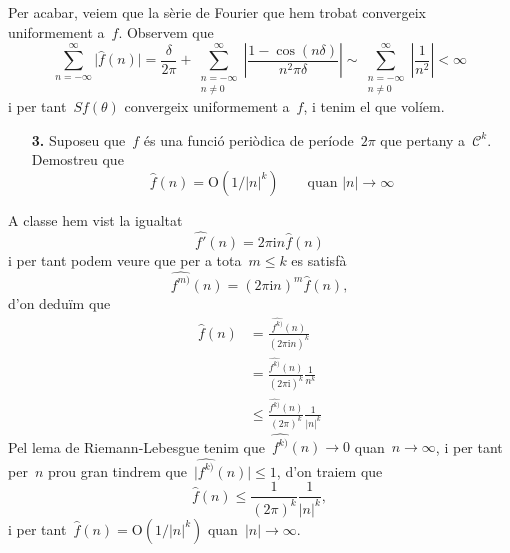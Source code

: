 \documentclass[a4paper]{article}
\newcommand{\iu}{\mathrm{i}}
\newcommand{\uppi}{\pi}
\newcommand{\abs}[1]{\lvert{#1}\rvert}
\newcommand{\Abs}[1]{\left\lvert{#1}\right\rvert}
\begin{document}
Per acabar, veiem que la sèrie de Fourier que hem trobat convergeix uniformement
a~\(f\). Observem que
\[
    \sum_{n=-\infty}^{\infty}\abs{\widehat{f}(n)}
    = \frac{\delta}{2\uppi} + \sum_{\substack{n=-\infty\\n\neq0}}^{\infty}
    \Abs{\frac{1 - \cos(n\delta)}{n^{2}\uppi\delta}}
    \sim \sum_{\substack{n=-\infty\\n\neq0}}^{\infty} \Abs{\frac{1}{n^{2}}}
    < \infty
\]
i per tant~\(Sf(\theta)\) convergeix uniformement a~\(f\), i tenim el que
volíem.

\clearpage
\begin{enumerate}
    \item[\textbf{3.}] Suposeu que~\(f\) és una funció periòdica de
        període~\(2\uppi\) que pertany a~\(\mathcal{C}^{k}\). Demostreu que
        \[
            \widehat{f}(n) = \mathrm{O}(1/\abs{n}^{k})
            \qquad\text{quan }
            \abs{n}\to\infty
        \]
\end{enumerate}
A classe hem vist la igualtat
\[
    \widehat{f'}(n) = 2\uppi\iu n\widehat{f}(n)
\]
i per tant podem veure que per a tota~\(m\leq k\) es satisfà
\[
    \widehat{f^{m)}}(n) = (2\uppi\iu n)^{m}\widehat{f}(n),
\]
d'on deduïm que
\begin{align*}
    \widehat{f}(n) &= \frac{\widehat{f^{k)}}(n)}{(2\uppi\iu n)^{k}} \\
                   &= \frac{\widehat{f^{k)}}(n)}{(2\uppi\iu)^{k}}
                      \frac{1}{n^{k}} \\
                   &\leq \frac{\widehat{f^{k)}}(n)}{(2\uppi)^{k}}
                      \frac{1}{\abs{n}^{k}}
\end{align*}
Pel lema de Riemann-Lebesgue tenim que~\(\widehat{f^{k)}}(n) \to 0\)
quan~\(n\to\infty\), i per tant per~\(n\) prou gran tindrem
que~\(\abs{\widehat{f^{k)}}(n)}\leq1\), d'on traiem que
\[
    \widehat{f}(n) \leq \frac{1}{(2\uppi)^{k}}\frac{1}{\abs{n}^{k}},
\]
i per tant~\(\widehat{f}(n) = \mathrm{O}(1/\abs{n}^{k})\)
quan~\(\abs{n}\to\infty\).
\end{document}
